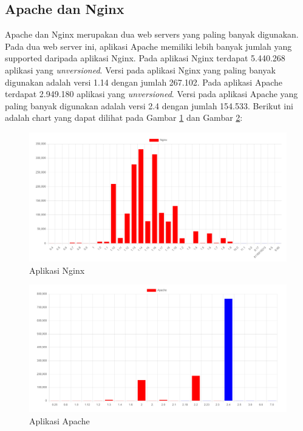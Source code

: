 \subsection{Apache dan Nginx}
Apache dan Nginx merupakan dua web servers yang paling banyak digunakan. Pada dua web server ini, aplikasi Apache memiliki lebih banyak jumlah yang supported daripada aplikasi Nginx. Pada aplikasi Nginx terdapat 5.440.268 aplikasi yang \textit{unversioned}. Versi pada aplikasi Nginx yang paling banyak digunakan adalah versi 1.14 dengan jumlah 267.102. Pada aplikasi Apache terdapat 2.949.180 aplikasi yang \textit{unversioned}. Versi pada aplikasi Apache yang paling banyak digunakan adalah versi 2.4 dengan jumlah 154.533. Berikut ini adalah chart yang dapat dilihat pada Gambar \ref{fig:data_sample_nginx} dan Gambar \ref{fig:data_sample_apache}:
\begin{figure}[H]
	\centering  
	\includegraphics[scale=0.7]{Gambar/data_sample_nginx.png}  
	\caption{Aplikasi Nginx} 
	\label{fig:data_sample_nginx} 
\end{figure}

\begin{figure}[H]
	\centering  
	\includegraphics[scale=0.7]{Gambar/apache.png}  
	\caption{Aplikasi Apache} 
	\label{fig:data_sample_apache} 
\end{figure}

